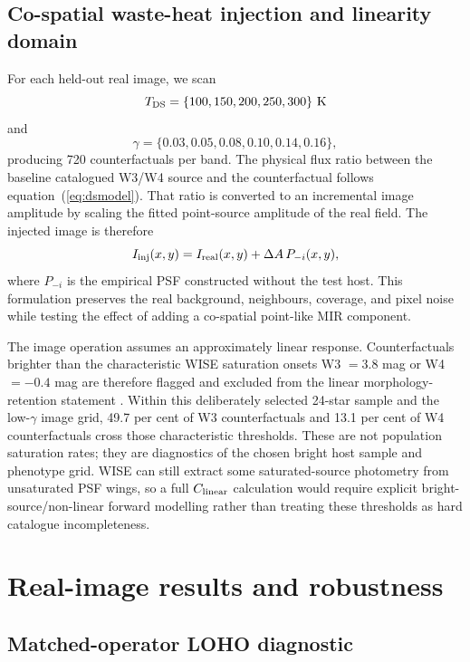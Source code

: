 \documentclass[fleqn,usenatbib]{mnras}
\begin{document}
\subsection{Co-spatial waste-heat injection and linearity domain}

For each held-out real image, we scan
\begin{equation}
T_{\rm DS}=\{100,150,200,250,300\}\ {\rm K}
\end{equation}
and
\begin{equation}
\gamma=\{0.03,0.05,0.08,0.10,0.14,0.16\},
\end{equation}
producing 720 counterfactuals per band. The physical flux ratio between the baseline catalogued W3/W4 source and the counterfactual follows equation~(\ref{eq:dsmodel}). That ratio is converted to an incremental image amplitude by scaling the fitted point-source amplitude of the real field. The injected image is therefore
\begin{equation}
I_{\rm inj}(x,y)=I_{\rm real}(x,y)+\Delta A\,P_{-i}(x,y),
\end{equation}
where $P_{-i}$ is the empirical PSF constructed without the test host. This formulation preserves the real background, neighbours, coverage, and pixel noise while testing the effect of adding a co-spatial point-like MIR component.

The image operation assumes an approximately linear response. Counterfactuals brighter than the characteristic WISE saturation onsets W3 $=3.8$ mag or W4 $=-0.4$ mag are therefore flagged and excluded from the linear morphology-retention statement \citep{Cutri2012}. Within this deliberately selected 24-star sample and the low-$\gamma$ image grid, 49.7 per cent of W3 counterfactuals and 13.1 per cent of W4 counterfactuals cross those characteristic thresholds. These are not population saturation rates; they are diagnostics of the chosen bright host sample and phenotype grid. WISE can still extract some saturated-source photometry from unsaturated PSF wings, so a full $C_{\rm linear}$ calculation would require explicit bright-source/non-linear forward modelling rather than treating these thresholds as hard catalogue incompleteness.

\section{Real-image results and robustness}
\label{sec:image_results}

\subsection{Matched-operator LOHO diagnostic}
\end{document}
